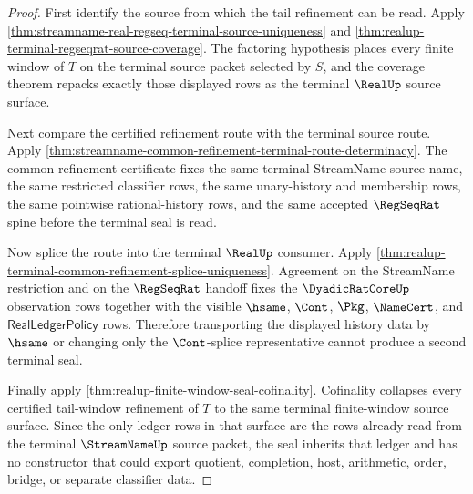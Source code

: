 \begin{proof}
First identify the source from which the tail refinement can be read. Apply
\autoref{thm:streamname-real-regseq-terminal-source-uniqueness} and
\autoref{thm:realup-terminal-regseqrat-source-coverage}. The factoring
hypothesis places every finite window of $T$ on the terminal source packet
selected by $S$, and the coverage theorem repacks exactly those displayed rows
as the terminal $\RealUp$ source surface.

Next compare the certified refinement route with the terminal source route.
Apply \autoref{thm:streamname-common-refinement-terminal-route-determinacy}.
The common-refinement certificate fixes the same terminal StreamName source
name, the same restricted classifier rows, the same unary-history and
membership rows, the same pointwise rational-history rows, and the same
accepted $\RegSeqRat$ spine before the terminal seal is read.

Now splice the route into the terminal $\RealUp$ consumer. Apply
\autoref{thm:realup-terminal-common-refinement-splice-uniqueness}. Agreement
on the StreamName restriction and on the $\RegSeqRat$ handoff fixes the
$\DyadicRatCoreUp$ observation rows together with the visible $\hsame$,
$\Cont$, $\Pkg$, $\NameCert$, and $\mathsf{RealLedgerPolicy}$ rows. Therefore
transporting the displayed history data by $\hsame$ or changing only the
$\Cont$-splice representative cannot produce a second terminal seal.

Finally apply \autoref{thm:realup-finite-window-seal-cofinality}. Cofinality
collapses every certified tail-window refinement of $T$ to the same terminal
finite-window source surface. Since the only ledger rows in that surface are
the rows already read from the terminal $\StreamNameUp$ source packet, the seal
inherits that ledger and has no constructor that could export quotient,
completion, host, arithmetic, order, bridge, or separate classifier data.
\end{proof}

